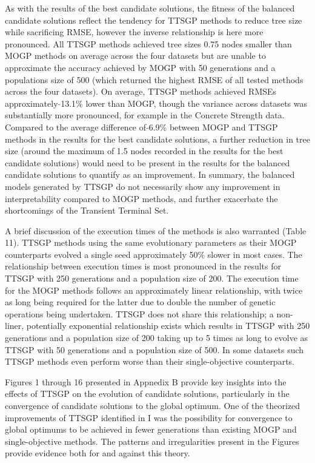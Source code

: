 \documentclass[a4paper, twocolumn]{article}
\begin{document}
As with the results of the best candidate solutions, the fitness of the balanced candidate solutions reflect the tendency for TTSGP methods to reduce tree size while sacrificing RMSE, however the inverse relationship is here more pronounced. All TTSGP methods achieved tree sizes 0.75 nodes smaller than MOGP methods on average across the four datasets but are unable to approximate the accuracy achieved by MOGP with 50 generations and a populations size of 500 (which returned the highest RMSE of all tested methods across the four datasets). On average, TTSGP methods achieved RMSEs approximately $\tilde{}$13.1\% lower than MOGP, though the variance across datasets was substantially more pronounced, for example in the Concrete Strength data. Compared to the average difference of $\tilde{}$6.9\% between MOGP and TTSGP methods in the results for the best candidate solutions, a further reduction in tree size (around the maximum of 1.5 nodes recorded in the results for the best candidate solutions) would need to be present in the results for the balanced candidate solutions to quantify as an improvement. In summary, the balanced models generated by TTSGP do not necessarily show any improvement in interpretability compared to MOGP methods, and further exacerbate the shortcomings of the Transient Terminal Set. 

A brief discussion of the execution times of the methods is also warranted (Table 11). TTSGP methods using the same evolutionary parameters as their MOGP counterparts evolved a single seed approximately 50\% slower in most cases. The relationship between execution times is most pronounced in the results for TTSGP with 250 generations and a population size of 200. The execution time for the MOGP methods follows an approximately linear relationship, with twice as long being required for the latter due to double the number of genetic operations being undertaken. TTSGP does not share this relationship; a non-liner, potentially exponential relationship exists which results in TTSGP with 250 generations and a population size of 200 taking up to 5 times as long to evolve as TTSGP with 50 generations and a population size of 500. In some datasets such TTSGP methods even perform worse than their single-objective counterparts.

Figures 1 through 16 presented in Appnedix B provide key insights into the effects of TTSGP on the evolution of candidate solutions, particularly in the convergence of candidate solutions to the global optimum. One of the theorized improvements of TTSGP identified in I was the possibility for convergence to global optimums to be achieved in fewer generations than existing MOGP and single-objective methods. The patterns and irregularities present in the Figures provide evidence both for and against this theory.
\end{document}
